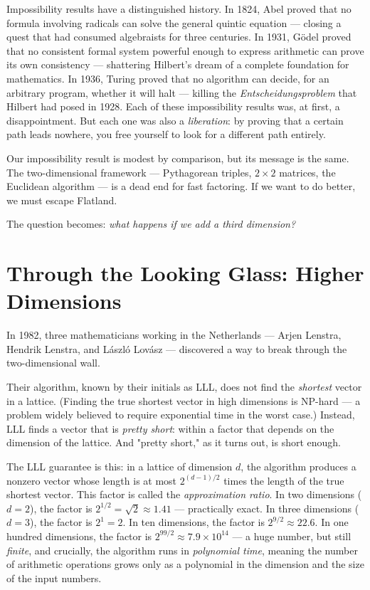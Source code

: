 \documentclass[11pt,openright,twoside]{book}
\theoremstyle{definition}
\begin{document}
Impossibility results have a distinguished history. In 1824, Abel proved that no formula involving radicals can solve the general quintic equation --- closing a quest that had consumed algebraists for three centuries. In 1931, Gödel proved that no consistent formal system powerful enough to express arithmetic can prove its own consistency --- shattering Hilbert's dream of a complete foundation for mathematics. In 1936, Turing proved that no algorithm can decide, for an arbitrary program, whether it will halt --- killing the \textit{Entscheidungsproblem} that Hilbert had posed in 1928. Each of these impossibility results was, at first, a disappointment. But each one was also a \textit{liberation}: by proving that a certain path leads nowhere, you free yourself to look for a different path entirely.

Our impossibility result is modest by comparison, but its message is the same. The two-dimensional framework --- Pythagorean triples, $2 \times 2$ matrices, the Euclidean algorithm --- is a dead end for fast factoring. If we want to do better, we must escape Flatland.

The question becomes: \textit{what happens if we add a third dimension?}


\bigskip


\section{Through the Looking Glass: Higher Dimensions}

In 1982, three mathematicians working in the Netherlands --- Arjen Lenstra, Hendrik Lenstra, and László Lovász --- discovered a way to break through the two-dimensional wall.

Their algorithm, known by their initials as LLL, does not find the \textit{shortest} vector in a lattice. (Finding the true shortest vector in high dimensions is NP-hard --- a problem widely believed to require exponential time in the worst case.) Instead, LLL finds a vector that is \textit{pretty short}: within a factor that depends on the dimension of the lattice. And "pretty short," as it turns out, is short enough.

The LLL guarantee is this: in a lattice of dimension $d$, the algorithm produces a nonzero vector whose length is at most $2^{(d-1)/2}$ times the length of the true shortest vector. This factor is called the \textit{approximation ratio}. In two dimensions ($d = 2$), the factor is $2^{1/2} = \sqrt{2} \approx 1.41$ --- practically exact. In three dimensions ($d = 3$), the factor is $2^1 = 2$. In ten dimensions, the factor is $2^{9/2} \approx 22.6$. In one hundred dimensions, the factor is $2^{99/2} \approx 7.9 \times 10^{14}$ --- a huge number, but still \textit{finite}, and crucially, the algorithm runs in \textit{polynomial time}, meaning the number of arithmetic operations grows only as a polynomial in the dimension and the size of the input numbers.
\end{document}
